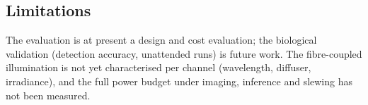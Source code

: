 \subsection{Limitations}
The evaluation is at present a design and cost evaluation; the biological
validation (detection accuracy, unattended runs) is future work. The
fibre-coupled illumination is not yet characterised per channel (wavelength,
diffuser, irradiance), and the
full power budget under imaging, inference and slewing has not been measured.
